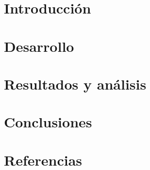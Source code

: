 \documentclass[11pt, a4paper]{article}
\begin{document}

\maketitle
\newpage
\tableofcontents
\newpage

\section{Introducción}

%	

\section{Desarrollo}

%

\section{Resultados y análisis}



\section{Conclusiones}

%

\section{Referencias}

%
\end{document}
